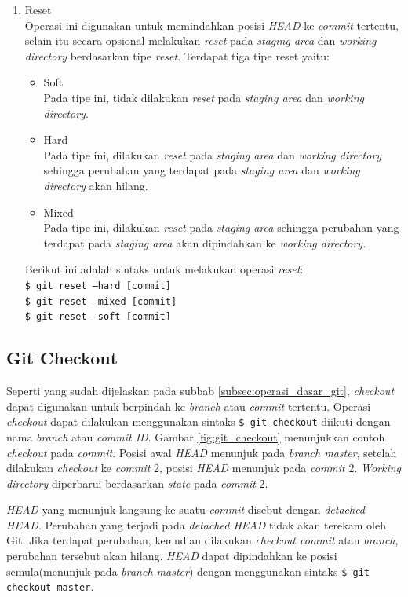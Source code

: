 \begin{enumerate}
\item Reset\\
Operasi ini digunakan untuk memindahkan posisi \textit{HEAD} ke \textit{commit} tertentu, selain itu secara opsional  melakukan \textit{reset} pada \textit{staging area} dan \textit{working directory} berdasarkan tipe \textit{reset}. Terdapat tiga tipe reset yaitu:
\begin{itemize}
\item Soft\\
Pada tipe ini, tidak dilakukan \textit{reset} pada \textit{staging area} dan \textit{working directory}.
\item Hard\\
Pada tipe ini, dilakukan \textit{reset} pada \textit{staging area} dan \textit{working directory} sehingga perubahan yang terdapat pada \textit{staging area} dan \textit{working directory} akan hilang.
\item Mixed\\
Pada tipe ini, dilakukan \textit{reset} pada \textit{staging area} sehingga perubahan yang terdapat pada \textit{staging area} akan dipindahkan ke \textit{working directory}.  
\end{itemize} 

Berikut ini adalah sintaks untuk melakukan operasi \textit{reset}:\\
\texttt{\$ git reset --hard [commit]}\\
\texttt{\$ git reset --mixed [commit]}\\
\texttt{\$ git reset --soft [commit]}
\end{enumerate}
\subsection{Git Checkout}
\label{subsec:git_checkout}
Seperti yang sudah dijelaskan pada subbab \ref{subsec:operasi_dasar_git}, \textit{checkout} dapat digunakan untuk berpindah ke \textit{branch} atau \textit{commit} tertentu. Operasi \textit{checkout} dapat dilakukan menggunakan sintaks \texttt{\$ git checkout} diikuti dengan nama \textit{branch} atau \textit{commit ID}. Gambar \ref{fig:git_checkout} menunjukkan contoh \textit{checkout} pada \textit{commit}. Posisi awal \textit{HEAD} menunjuk pada \textit{branch master}, setelah dilakukan \textit{checkout} ke \textit{commit} 2, posisi \textit{HEAD} menunjuk pada \textit{commit} 2. \textit{Working directory} diperbarui berdasarkan \textit{state} pada \textit{commit} 2. 

\textit{HEAD} yang menunjuk langsung ke suatu \textit{commit} disebut dengan \textit{detached HEAD}. Perubahan yang terjadi pada \textit{detached HEAD} tidak akan terekam oleh Git. Jika terdapat perubahan, kemudian dilakukan \textit{checkout commit} atau \textit{branch}, perubahan tersebut akan hilang. \textit{HEAD} dapat dipindahkan ke posisi semula(menunjuk pada \textit{branch master}) dengan  menggunakan sintaks \texttt{\$ git checkout master}.


